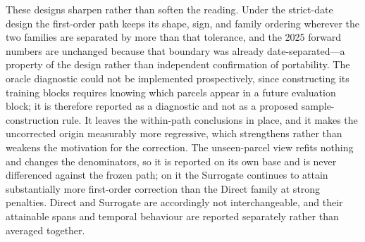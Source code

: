 \documentclass[10pt]{article}
\theoremstyle{definition}
\newcommand{\1}{\mathbf{1}}
\begin{document}
These designs sharpen rather than soften the reading. Under the strict-date design the
first-order path keeps its shape, sign, and family ordering wherever the two families
are separated by more than that tolerance, and the 2025 forward numbers are unchanged
because that boundary was already date-separated---a property of the design rather than
independent confirmation of portability. The oracle diagnostic could not be implemented
prospectively, since constructing its training blocks requires knowing which parcels
appear in a future evaluation block; it is therefore reported as a diagnostic and not as
a proposed sample-construction rule. It leaves the within-path conclusions in place, and
it makes the uncorrected origin measurably more regressive, which strengthens rather
than weakens the motivation for the correction. The unseen-parcel view refits nothing
and changes the denominators, so it is reported on its own base and is never differenced
against the frozen path; on it the Surrogate continues to attain substantially more
first-order correction than the Direct family at strong penalties. Direct and Surrogate
are accordingly not interchangeable, and their attainable spans and temporal behaviour
are reported separately rather than averaged together.
\end{document}
